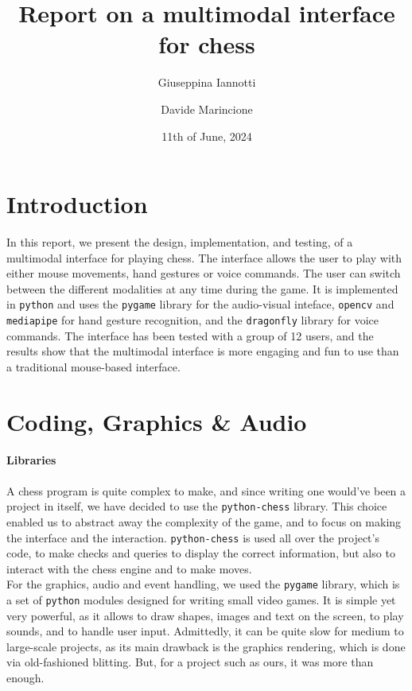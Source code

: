 \documentclass[a4paper, 11pt, twocolumn]{IEEEtran}
\title{Report on a multimodal interface for chess}
\author[1]{Giuseppina Iannotti}
\author[2]{Davide Marincione}
\affil[1]{1938436, \texttt{iannotti.1938436@studenti.uniroma1.it}}
\affil[2]{1927757, \texttt{marincione.1927757@studenti.uniroma1.it}}
\date{11th of June, 2024}
\begin{document}
    \maketitle

    \section{Introduction}
    In this report, we present the design, implementation, and testing, of a multimodal interface for playing chess. The interface allows the user to play with either mouse movements, hand gestures or voice commands. The user can switch between the different modalities at any time during the game. It is implemented in \texttt{python} and uses the \texttt{pygame} library for the audio-visual inteface, \texttt{opencv} and \texttt{mediapipe} for hand gesture recognition, and the \texttt{dragonfly} library for voice commands. The interface has been tested with a group of 12 users, and the results show that the multimodal interface is more engaging and fun to use than a traditional mouse-based interface.

    \section{Coding, Graphics \& Audio}
    \paragraph*{Libraries} A chess program is quite complex to make, and since writing one would've been a project in itself, we have decided to use the \texttt{python-chess} library. This choice enabled us to abstract away the complexity of the game, and to focus on making the interface and the interaction. \texttt{python-chess} is used all over the project's code, to make checks and queries to display the correct information, but also to interact with the chess engine and to make moves.\\For the graphics, audio and event handling, we used the \texttt{pygame} library, which is a set of \texttt{python} modules designed for writing small video games. It is simple yet very powerful, as it allows to draw shapes, images and text on the screen, to play sounds, and to handle user input. Admittedly, it can be quite slow for medium to large-scale projects, as its main drawback is the graphics rendering, which is done via old-fashioned blitting. But, for a project such as ours, it was more than enough.
\end{document}
